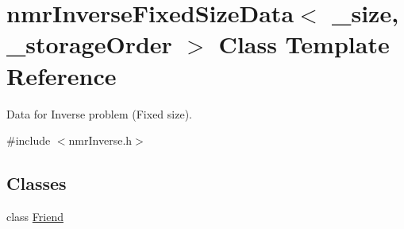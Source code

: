\hypertarget{classnmr_inverse_fixed_size_data}{}\section{nmr\+Inverse\+Fixed\+Size\+Data$<$ \+\_\+size, \+\_\+storage\+Order $>$ Class Template Reference}
\label{classnmr_inverse_fixed_size_data}


Data for Inverse problem (Fixed size).  




{\ttfamily \#include $<$nmr\+Inverse.\+h$>$}

\subsection*{Classes}
\begin{DoxyCompactItemize}
\item 
class \hyperlink{classnmr_inverse_fixed_size_data_1_1_friend}{Friend}
\end{DoxyCompactItemize}
